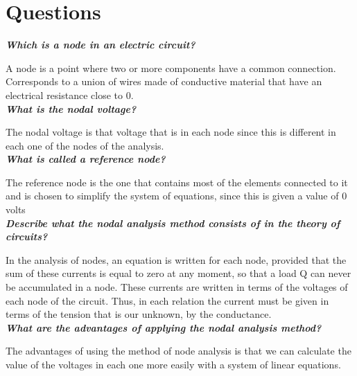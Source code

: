 \documentclass[letterpaper]{article}
\begin{document}
\section{Questions}
\textit{\textbf{Which is a node in an electric circuit?}}

A node is a point where two or more components have a common connection. Corresponds to a union
of wires made of conductive material that have an electrical resistance close to 0.\\
\textit{\textbf{What is the nodal voltage?}}

The nodal voltage is that voltage that is in each node since this is different in each one of the
nodes of the analysis.\\
\textit{\textbf{What is called a reference node?}}

The reference node is the one that contains most of the elements connected to it and is chosen to
simplify the system of equations, since this is given a value of 0 volts\\
\textit{\textbf{Describe what the nodal analysis method consists of in the theory of circuits?}}

In the analysis of nodes, an equation is written for each node, provided that the sum of these
currents is equal to zero at any moment, so that a load Q can never be accumulated in a node.
These currents are written in terms of the voltages of each node of the circuit. Thus, in each
relation the current must be given in terms of the tension that is our unknown, by the
conductance.\\
\textit{\textbf{What are the advantages of applying the nodal analysis method?}}

The advantages of using the method of node analysis is that we can calculate the value of the voltages in each one more easily with a system of linear equations.
\end{document}
